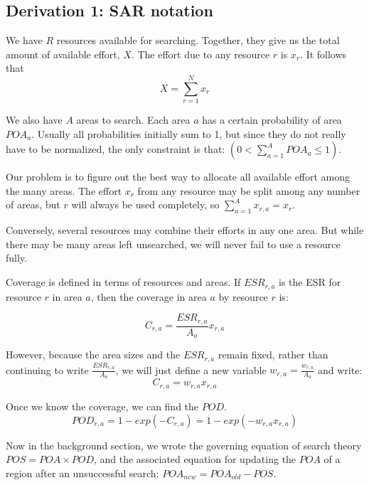 \documentclass[10pt]{article}
\begin{document}
\subsection{Derivation 1: SAR notation}
\label{sec:SAR-notation}

We have $R$ resources available for searching. Together, they give us
the total amount of available effort, $X$. The effort due to any
resource $r$ is $x_r$. It follows that 
\begin{equation}
  \label{eq:10}
  X = \sum_{r=1}^N x_r
\end{equation}

We also have $A$ areas to search. Each area $a$ has a certain
probability of area $POA_a$. Usually all probabilities initially sum
to 1, but since they do not really have to be normalized, the only
constraint is that: $(0 < \sum_{a=1}^A POA_a \leq 1)$.

Our problem is to figure out the best way to allocate all available
effort among the many areas. The effort  $x_r$ from any resource
may be split among any number of areas, but $r$ will always be used
completely, so $\sum_{a=1}^A x_{r,a} = x_r$. 

Conversely, several resources may combine their efforts in any one
area. But while there may be many areas left unsearched, we will never
fail to use a resource fully.

Coverage is defined in terms of resources and areas. If $ESR_{r,a}$ is the 
ESR for resource $r$ in area $a$, then the coverage in area $a$ by
resource $r$ is:

\begin{equation}
  \label{eq:C_ra}
  C_{r,a} = \frac{ESR_{r,a}}{A_a} x_{r,a}
\end{equation}

However, because the area sizes and the $ESR_{r,a}$ remain fixed,
rather than continuing to write $\frac{ESR_{r,a}}{A_a}$, we will
just define a new variable $w_{r,a} = \frac{w_{r,a}}{A_a}$ and write:
\begin{equation}
  \label{eq:C_ra}
  C_{r,a} = w_{r,a} x_{r,a}
\end{equation}

Once we know the coverage, we can find the $POD$. 
\begin{equation}
  \label{eq:POD_ra}
  POD_{r,a} = 1 - exp(-C_{r,a}) = 1 - exp(-w_{r,a} x_{r,a})
\end{equation}

Now in the background section, we wrote the governing equation of
search theory $POS = POA \times POD$, and the associated equation for
updating the $POA$ of a region after an unsuccessful search:
$POA_{new} = POA_{old} - POS$. 
\end{document}
